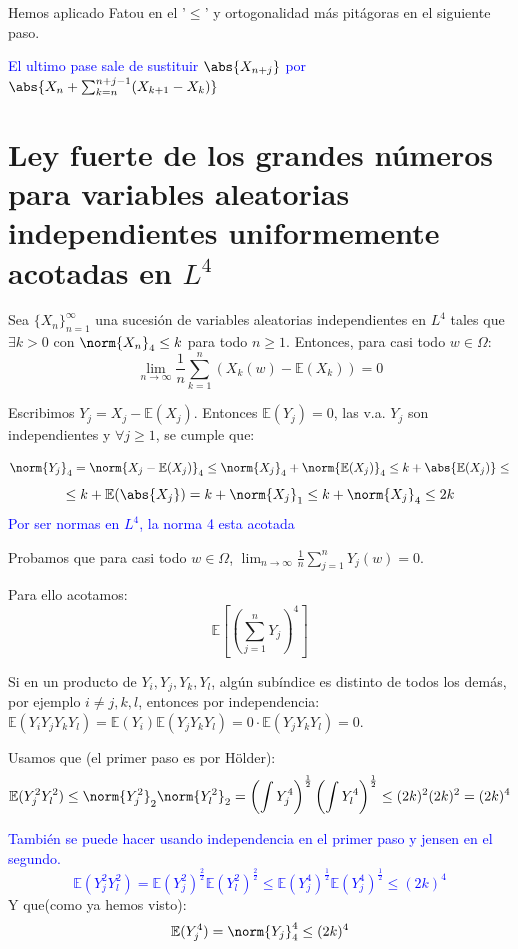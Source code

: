 \documentclass{apuntes}
\begin{document}
Hemos aplicado Fatou en el '$\leq$' y ortogonalidad más pitágoras en el siguiente paso.


\textcolor{blue}{El ultimo pase sale de sustituir $\abs{X_{n+j}}$ por $\abs{X_n + \sum_{k=n}^{n+j-1}(X_{k+1}-X_k)}$}


\section{Ley fuerte de los grandes números para variables aleatorias independientes uniformemente acotadas en $L^4$}
Sea $\{X_n\}_{n=1}^{\infty}$ una sucesión de variables aleatorias independientes en $L^4$ tales que $\exists k>0$ con $\norm{X_n}_4 \leq k$ para todo $n \geq 1$. Entonces, para casi todo $w \in \Omega$:
\[
\lim_{n \rightarrow \infty} \frac{1}{n}\sum_{k=1}^{n}\left( X_k(w) - \mathbb{E}(X_k) \right)= 0
\]


Escribimos $Y_j=X_j-\mathbb{E}(X_j)$. Entonces $\mathbb{E}(Y_j)=0$, las v.a. $Y_j$ son independientes y $\forall j \geq 1$, se cumple que:

\[
\norm{Y_j}_4 = \norm{X_j - \mathbb{E}(X_j)}_4 \leq \norm{X_j}_4 + \norm{\mathbb{E}(X_j)}_4 \leq k + \abs{\mathbb{E}(X_j)} \leq
\]
\[
\leq k + \mathbb{E}(\abs{X_j}) = k + \norm{X_j}_1 \leq k + \norm{X_j}_4 \leq 2k
\]
\textcolor{blue}{Por ser normas en $L^4$, la norma 4 esta acotada}

Probamos que para casi todo $w \in \Omega$, $\lim_{n \rightarrow \infty} \frac{1}{n} \sum_{j=1}^{n}Y_j(w)=0$.

Para ello acotamos:
\[
\mathbb{E}\left[ (\sum_{j=1}^{n} Y_j)^4 \right]
\]

Si en un producto de $Y_i, Y_j, Y_k, Y_l$, algún subíndice es distinto de todos los demás, por ejemplo $i\neq j,k,l$, entonces por independencia: $\mathbb{E}(Y_i Y_j Y_k Y_l)=\mathbb{E}(Y_i)\mathbb{E}(Y_j Y_k Y_l) = 0 \cdot \mathbb{E}(Y_j Y_k Y_l) = 0$.

Usamos que (el primer paso es por Hölder):
\[
\mathbb{E}(Y_j^2 Y_l^2) \leq \norm{Y_j^2}_2 \norm{Y_l^2}_2 = \left( \int Y_j^4\right)^{\frac{1}{2}} \left( \int Y_l^4\right)^{\frac{1}{2}} \leq (2k)^2(2k)^2=(2k)^4
\]

\textcolor{blue}{También se puede hacer usando independencia en el primer paso y jensen en el segundo.
\[
\mathbb{E}(Y_j^2 Y_l^2) = \mathbb{E}(Y_j^2)^\frac{2}{2} \mathbb{E}(Y_l^2)^\frac{2}{2} \leq \mathbb{E}(Y_j^4)^\frac{1}{2}\mathbb{E}(Y_j^4)^\frac{1}{2}\leq(2k)^4
\]
}
Y que(como ya hemos visto):
\[
\mathbb{E}(Y_j^4) = \norm{Y_j}_4^4\leq(2k)^4
\]
\end{document}
